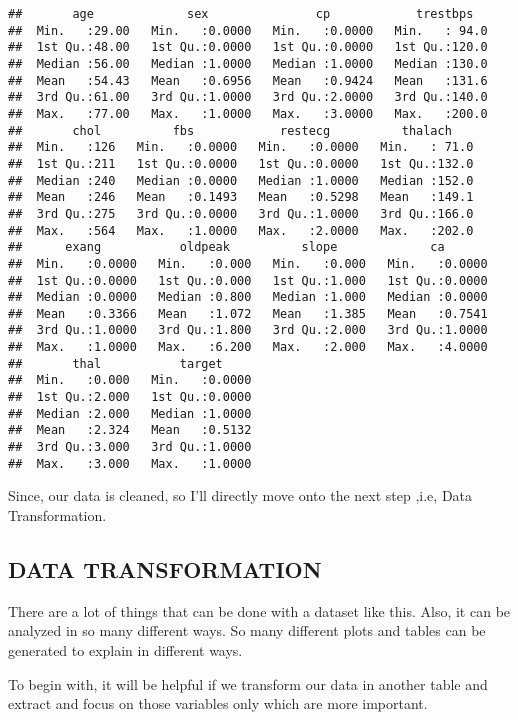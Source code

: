 \documentclass[
]{article}
\begin{document}
\begin{verbatim}
##       age             sex               cp            trestbps    
##  Min.   :29.00   Min.   :0.0000   Min.   :0.0000   Min.   : 94.0  
##  1st Qu.:48.00   1st Qu.:0.0000   1st Qu.:0.0000   1st Qu.:120.0  
##  Median :56.00   Median :1.0000   Median :1.0000   Median :130.0  
##  Mean   :54.43   Mean   :0.6956   Mean   :0.9424   Mean   :131.6  
##  3rd Qu.:61.00   3rd Qu.:1.0000   3rd Qu.:2.0000   3rd Qu.:140.0  
##  Max.   :77.00   Max.   :1.0000   Max.   :3.0000   Max.   :200.0  
##       chol          fbs            restecg          thalach     
##  Min.   :126   Min.   :0.0000   Min.   :0.0000   Min.   : 71.0  
##  1st Qu.:211   1st Qu.:0.0000   1st Qu.:0.0000   1st Qu.:132.0  
##  Median :240   Median :0.0000   Median :1.0000   Median :152.0  
##  Mean   :246   Mean   :0.1493   Mean   :0.5298   Mean   :149.1  
##  3rd Qu.:275   3rd Qu.:0.0000   3rd Qu.:1.0000   3rd Qu.:166.0  
##  Max.   :564   Max.   :1.0000   Max.   :2.0000   Max.   :202.0  
##      exang           oldpeak          slope             ca        
##  Min.   :0.0000   Min.   :0.000   Min.   :0.000   Min.   :0.0000  
##  1st Qu.:0.0000   1st Qu.:0.000   1st Qu.:1.000   1st Qu.:0.0000  
##  Median :0.0000   Median :0.800   Median :1.000   Median :0.0000  
##  Mean   :0.3366   Mean   :1.072   Mean   :1.385   Mean   :0.7541  
##  3rd Qu.:1.0000   3rd Qu.:1.800   3rd Qu.:2.000   3rd Qu.:1.0000  
##  Max.   :1.0000   Max.   :6.200   Max.   :2.000   Max.   :4.0000  
##       thal           target      
##  Min.   :0.000   Min.   :0.0000  
##  1st Qu.:2.000   1st Qu.:0.0000  
##  Median :2.000   Median :1.0000  
##  Mean   :2.324   Mean   :0.5132  
##  3rd Qu.:3.000   3rd Qu.:1.0000  
##  Max.   :3.000   Max.   :1.0000
\end{verbatim}

Since, our data is cleaned, so I'll directly move onto the next step
,i.e, Data Transformation.

\hypertarget{data-transformation}{%
\subsection{DATA TRANSFORMATION}\label{data-transformation}}

There are a lot of things that can be done with a dataset like this.
Also, it can be analyzed in so many different ways. So many different
plots and tables can be generated to explain in different ways.

To begin with, it will be helpful if we transform our data in another
table and extract and focus on those variables only which are more
important.
\end{document}

